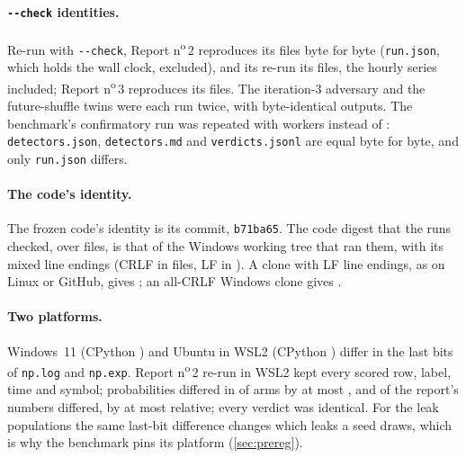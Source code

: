 \documentclass[11pt]{article}
\newcommand{\code}[1]{\texttt{#1}}
\begin{document}
\paragraph{\texorpdfstring{\code{-{}-check}}{--check} identities.} Re-run with \code{-{}-check}, Report n\textsuperscript{o}\,2
reproduces its \NumRepTwoCheckFiles{} files byte for byte (\code{run.json}, which holds the wall
clock, excluded), and its re-run its \NumRepTwoRerunFiles{} files, the hourly series included;
Report n\textsuperscript{o}\,3 reproduces its \NumRepThreeCheckFiles{} files. The iteration-3
adversary and the future-shuffle twins were each run twice, with byte-identical outputs. The
benchmark's confirmatory run was repeated with \NumRerunWorkers{} workers instead of
\NumConfWorkers: \code{detectors.json}, \code{detectors.md} and \code{verdicts.jsonl} are equal byte
for byte, and only \code{run.json} differs.

\paragraph{The code's identity.} The frozen code's identity is its commit, \code{b71ba65}. The code
digest that the runs checked, \NumCodeDigest{} over \NumCodeFiles{} files, is that of the Windows
working tree that ran them, with its mixed line endings (CRLF in \NumCrlfFiles{} files, LF in
\NumLfFiles). A clone with LF line endings, as on Linux or GitHub, gives \NumLfDigest; an all-CRLF
Windows clone gives \NumCrlfDigest.

\paragraph{Two platforms.} Windows~11 (CPython \NumPyWin) and Ubuntu in WSL2 (CPython \NumPyWSL)
differ in the last bits of \code{np.log} and \code{np.exp}. Report n\textsuperscript{o}\,2 re-run in
WSL2 kept every scored row, label, time and symbol; probabilities differed in \NumPlatProbArms{} of
\NumPlatArms{} arms by at most \NumPlatProbMax, and \NumPlatNums{} of the report's \NumPlatNumsOf{}
numbers differed, by at most \NumPlatRelMax{} relative; every verdict was identical. For the leak
populations the same last-bit difference changes which leaks a seed draws, which is why the benchmark
pins its platform (\cref{sec:prereg}).

\end{document}
